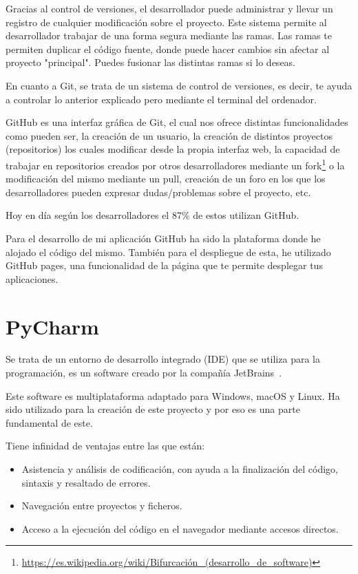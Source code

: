 \documentclass[a4paper, 12pt]{book}
\begin{document}
Gracias al control de versiones, el desarrollador puede administrar y llevar un registro de cualquier modificación sobre el proyecto. Este sistema permite al desarrollador trabajar de una forma segura mediante las ramas. Las ramas te permiten duplicar el código fuente, donde puede hacer cambios sin afectar al proyecto "principal". Puedes fusionar las distintas ramas si lo deseas.

En cuanto a Git, se trata de un sistema de control de versiones, es decir, te ayuda a controlar lo anterior explicado pero mediante el terminal del ordenador.

GitHub es una interfaz gráfica de Git, el cual nos ofrece distintas funcionalidades como pueden ser, la creación de un usuario, la creación de distintos proyectos (repositorios) los cuales modificar desde la propia interfaz web, la capacidad de trabajar en repositorios creados por otros desarrolladores mediante un fork\footnote{\url{https://es.wikipedia.org/wiki/Bifurcación_(desarrollo_de_software)}} o la modificación del mismo mediante un pull, creación de un foro en los que los desarrolladores pueden expresar dudas/problemas sobre el proyecto, etc.

Hoy en día según los desarrolladores  el 87\% de estos utilizan GitHub.

Para el desarrollo de mi aplicación GitHub ha sido la plataforma donde he alojado el código del mismo. También para el despliegue de esta, he utilizado GitHub pages, una funcionalidad de la página que te permite desplegar tus aplicaciones.

\section{PyCharm} %
\label{sec:GitHub}
Se trata de un entorno de desarrollo integrado (IDE) que se utiliza para la programación, es un software creado por la compañía JetBrains~\cite{jetbrains}.

Este software es multiplataforma adaptado para Windows, macOS y Linux. Ha sido utilizado para la creación de este proyecto y por eso es una parte fundamental de este.

Tiene infinidad de ventajas entre las que están:

\begin{itemize}
    \item Asistencia y análisis de codificación, con ayuda a la finalización del código, sintaxis y resaltado de errores.
    \item Navegación entre proyectos y ficheros.
    \item Acceso a la ejecución del código en el navegador mediante accesos directos.
\end{itemize}
\end{document}
